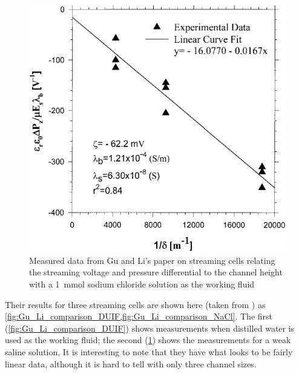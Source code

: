 \begin{figure}
    \centering
    \includegraphics{content/pt1/01-PowerHarvesting/graphics/GuLi_NaCl}
    \caption{\label{fig:Gu_Li_comparison_NaCl}Measured data from Gu and Li's paper on streaming cells relating the streaming voltage and pressure differential to the channel height with a \SI{1}{\milli\mole} sodium chloride solution as the working fluid}
\end{figure}

Their results for three streaming cells are shown here (taken from \cite{Gu2000}) as \cref{fig:Gu_Li_comparison_DUIF,fig:Gu_Li_comparison_NaCl}.
The first (\cref{fig:Gu_Li_comparison_DUIF}) shows measurements when distilled water is used as the working fluid; the second (\cref{fig:Gu_Li_comparison_NaCl}) shows the measurements for a weak saline solution.
It is interesting to note that they have what looks to be fairly linear data, although it is hard to tell with only three channel sizes.

